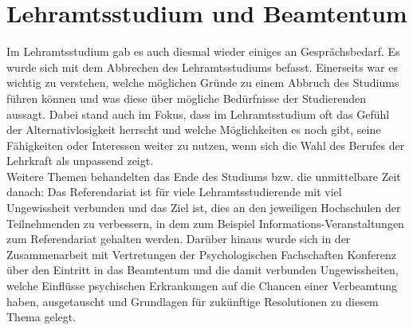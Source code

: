 \documentclass[DIV=calc]{scrartcl}
\begin{document}
\section*{Lehramtsstudium und Beamtentum}
Im Lehramtsstudium gab es auch diesmal wieder einiges an Gesprächsbedarf. Es wurde sich mit dem Abbrechen des Lehramtsstudiums befasst. Einerseits war es wichtig zu verstehen, welche möglichen Gründe zu einem Abbruch des Studiums führen können und was diese über mögliche Bedürfnisse der Studierenden aussagt. Dabei stand auch im Fokus, dass im Lehramtsstudium oft das Gefühl der Alternativlosigkeit herrscht und welche Möglichkeiten es noch gibt, seine Fähigkeiten oder Interessen weiter zu nutzen, wenn sich die Wahl des Berufes der Lehrkraft als unpassend zeigt.\\
Weitere Themen behandelten das Ende des Studiums bzw. die unmittelbare Zeit danach: Das Referendariat ist für viele Lehramtsstudierende mit viel Ungewissheit verbunden und das Ziel ist, dies an den jeweiligen Hochschulen der Teilnehmenden zu verbessern, in dem zum Beispiel Informations-Veranstaltungen zum Referendariat gehalten werden. Darüber hinaus wurde sich in der Zusammenarbeit mit Vertretungen der Psychologischen Fachschaften Konferenz über den Eintritt in das Beamtentum und die damit verbunden Ungewissheiten, welche Einflüsse psychischen Erkrankungen auf die Chancen einer Verbeamtung haben, ausgetauscht und Grundlagen für zukünftige Resolutionen zu diesem Thema gelegt.
\end{document}
